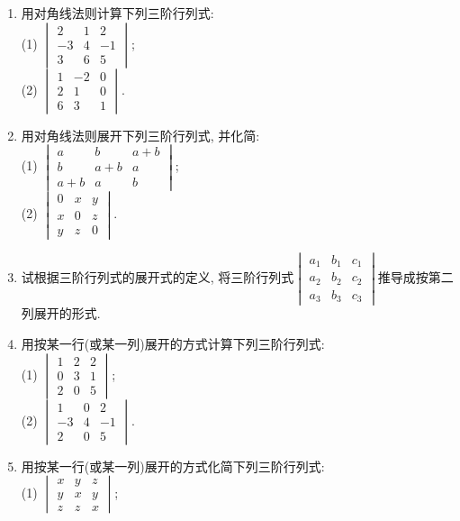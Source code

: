 \documentclass[10pt,a4paper]{article}
\begin{document}
\begin{enumerate}[1.]
\item 用对角线法则计算下列三阶行列式:\\
(1) $\begin{vmatrix}    2 & 1 & 2  \\-3 & 4 & -1  \\3 & 6 & 5  \end{vmatrix}$;\\
(2) $\begin{vmatrix}    1 & -2 & 0  \\2 & 1 & 0  \\6 & 3 & 1  \end{vmatrix}$.
\item 用对角线法则展开下列三阶行列式, 并化简:\\
(1) $\begin{vmatrix}   a & b & a+b  \\b & a+b & a  \\a+b & a & b  \end{vmatrix}$;\\
(2) $\begin{vmatrix}    0 & x & y  \\x & 0 & z  \\y & z & 0  \end{vmatrix}$.
\item 试根据三阶行列式的展开式的定义, 将三阶行列式$\begin{vmatrix}    a_1 & b_1 & c_1  \\a_2 & b_2 & c_2  \\a_3 & b_3 & c_3  \end{vmatrix}$推导成按第二列展开的形式.
\item 用按某一行(或某一列)展开的方式计算下列三阶行列式:\\
(1) $\begin{vmatrix}    1 & 2 & 2  \\0 & 3 & 1  \\2 & 0 & 5  \end{vmatrix}$;\\
(2) $\begin{vmatrix}    1 & 0 & 2  \\-3 & 4 & -1  \\2 & 0 & 5  \end{vmatrix}$.
\item 用按某一行(或某一列)展开的方式化简下列三阶行列式:\\
(1) $\begin{vmatrix}    x & y & z  \\y & x &  y  \\z & z & x  \end{vmatrix}$;\\

\end{enumerate}
\end{document}
